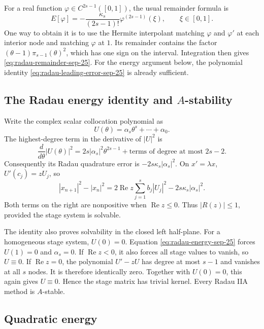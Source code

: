For a real function \(\varphi\in C^{2s-1}([0,1])\), the usual
remainder formula is
\begin{equation}\label{eq:radau-remainder-sep-25}
 E[\varphi]
   =-\frac{\kappa_s}{(2s-1)!}\varphi^{(2s-1)}(\xi),
   \qquad \xi\in[0,1].
\end{equation}
One way to obtain it is to use the Hermite interpolant matching
\(\varphi\) and \(\varphi'\) at each interior node and matching
\(\varphi\) at \(1\). Its remainder contains the factor
\((\theta-1)\pi_{s-1}(\theta)^2\), which has one sign on the
interval. Integration then gives
\eqref{eq:radau-remainder-sep-25}.
For the energy argument below, the polynomial identity
\eqref{eq:radau-leading-error-sep-25} is already sufficient.

\subsection{The Radau energy identity and \texorpdfstring{\(A\)}{A}-stability}

Write the complex scalar collocation polynomial as
\[
 U(\theta)=\alpha_s\theta^s+\cdots+\alpha_0.
\]
The highest-degree term in the derivative of \(|U|^2\) is
\[
 \frac{d}{d\theta}|U(\theta)|^2
     =2s|\alpha_s|^2\theta^{2s-1}
          +\text{terms of degree at most }2s-2.
\]
Consequently its Radau quadrature error is
\(-2s\kappa_s|\alpha_s|^2\). On \(x'=\lambda x\),
\(U'(c_j)=zU_j\), so
\begin{equation}\label{eq:radau-energy-sep-25}
 \boxed{
 |x_{n+1}|^2-|x_n|^2
   =2\operatorname{Re}z\sum_{j=1}^s b_j|U_j|^2
       -2s\kappa_s|\alpha_s|^2.}
\end{equation}
Both terms on the right are nonpositive when
\(\operatorname{Re}z\leq0\). Thus \(|R(z)|\leq1\), provided
the stage system is solvable.

The identity also proves solvability in the closed left half-plane.
For a homogeneous stage system, \(U(0)=0\). Equation
\eqref{eq:radau-energy-sep-25} forces \(U(1)=0\) and
\(\alpha_s=0\). If \(\operatorname{Re}z<0\), it also forces
all stage values to vanish, so \(U\equiv0\). If
\(\operatorname{Re}z=0\), the polynomial \(U'-zU\) has degree
at most \(s-1\) and vanishes at all \(s\) nodes. It is therefore
identically zero. Together with \(U(0)=0\), this again gives
\(U\equiv0\). Hence the stage matrix has trivial kernel.
Every Radau IIA method is \(A\)-stable.

\subsection{Quadratic energy}

